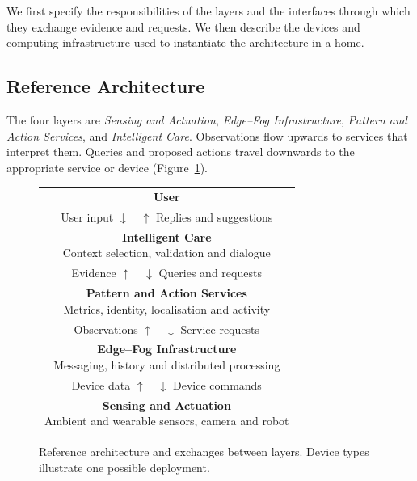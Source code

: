 \documentclass[a4paper,twoside]{article}
\begin{document}
We first specify the responsibilities of the layers and the interfaces through which they exchange evidence and requests. We then describe the devices and computing infrastructure used to instantiate the architecture in a home.

\subsection{Reference Architecture}
\label{subsec:general-architecture}

The four layers are \emph{Sensing and Actuation}, \emph{Edge--Fog Infrastructure}, \emph{Pattern and Action Services}, and \emph{Intelligent Care}. Observations flow upwards to services that interpret them. Queries and proposed actions travel downwards to the appropriate service or device (Figure~\ref{fig:reference}).

\begin{figure}[t]
\centering
\small
\setlength{\fboxsep}{4pt}
\begin{tabular}{@{}c@{}}
\textbf{User} \\
{\footnotesize User input \(\downarrow\quad\uparrow\) Replies and suggestions} \\
\fbox{\parbox{0.89\columnwidth}{\textbf{Intelligent Care}\\Context selection, validation and dialogue}} \\
{\footnotesize Evidence \(\uparrow\quad\downarrow\) Queries and requests} \\
\fbox{\parbox{0.89\columnwidth}{\textbf{Pattern and Action Services}\\Metrics, identity, localisation and activity}} \\
{\footnotesize Observations \(\uparrow\quad\downarrow\) Service requests} \\
\fbox{\parbox{0.89\columnwidth}{\textbf{Edge--Fog Infrastructure}\\Messaging, history and distributed processing}} \\
{\footnotesize Device data \(\uparrow\quad\downarrow\) Device commands} \\
\fbox{\parbox{0.89\columnwidth}{\textbf{Sensing and Actuation}\\Ambient and wearable sensors, camera and robot}} \\
\end{tabular}
\caption{Reference architecture and exchanges between layers. Device types illustrate one possible deployment.}
\label{fig:reference}
\end{figure}
\end{document}
